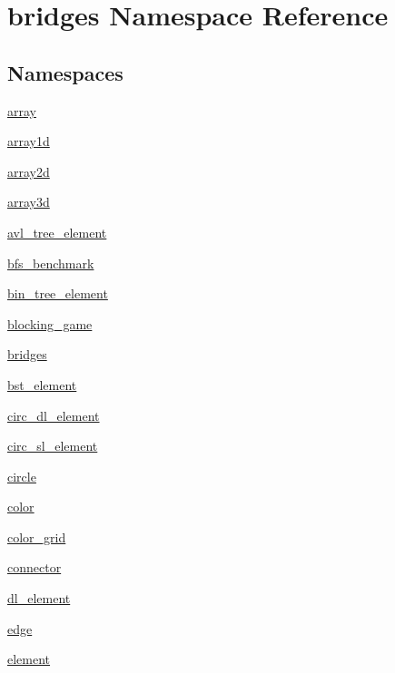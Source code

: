 \hypertarget{namespacebridges}{}\section{bridges Namespace Reference}
\label{namespacebridges}
\subsection*{Namespaces}
\begin{DoxyCompactItemize}
\item 
 \hyperlink{namespacebridges_1_1array}{array}
\item 
 \hyperlink{namespacebridges_1_1array1d}{array1d}
\item 
 \hyperlink{namespacebridges_1_1array2d}{array2d}
\item 
 \hyperlink{namespacebridges_1_1array3d}{array3d}
\item 
 \hyperlink{namespacebridges_1_1avl__tree__element}{avl\+\_\+tree\+\_\+element}
\item 
 \hyperlink{namespacebridges_1_1bfs__benchmark}{bfs\+\_\+benchmark}
\item 
 \hyperlink{namespacebridges_1_1bin__tree__element}{bin\+\_\+tree\+\_\+element}
\item 
 \hyperlink{namespacebridges_1_1blocking__game}{blocking\+\_\+game}
\item 
 \hyperlink{namespacebridges_1_1bridges}{bridges}
\item 
 \hyperlink{namespacebridges_1_1bst__element}{bst\+\_\+element}
\item 
 \hyperlink{namespacebridges_1_1circ__dl__element}{circ\+\_\+dl\+\_\+element}
\item 
 \hyperlink{namespacebridges_1_1circ__sl__element}{circ\+\_\+sl\+\_\+element}
\item 
 \hyperlink{namespacebridges_1_1circle}{circle}
\item 
 \hyperlink{namespacebridges_1_1color}{color}
\item 
 \hyperlink{namespacebridges_1_1color__grid}{color\+\_\+grid}
\item 
 \hyperlink{namespacebridges_1_1connector}{connector}
\item 
 \hyperlink{namespacebridges_1_1dl__element}{dl\+\_\+element}
\item 
 \hyperlink{namespacebridges_1_1edge}{edge}
\item 
 \hyperlink{namespacebridges_1_1element}{element}
\item 

\end{DoxyCompactItemize}
